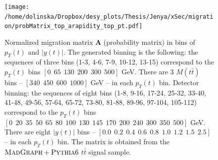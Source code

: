 \begin{figure}[p]
  \centering
  \texttt{[image: /home/dolinska/Dropbox/desy\_plots/Thesis/Jenya/xSec/migration/probMatrix\_top\_arapidity\_top\_pt.pdf]}
  \caption{Normalized migration matrix $\mathbf{A}$ (probability matrix) in bins of $p_{T}(t)$ and $|y(t)|$. The generated binning is the following:
          the sequences of three bins (1-3, 4-6, 7-9, 10-12, 13-15) correspond to the $p_{T}(t)$ bins $[0\:\:65\:\:130\:\:200\:\:300\:\:500]$ GeV.
          There are 3 $M(t\bar{t})$ bins -- $[340\:\:450\:\:600\:\:1000]$ GeV -- in each $p_{T}(t)$ bin.
          Detector binning:
          the sequences of eight bins (1-8, 9-16, 17-24, 25-32, 33-40, 41-48, 49-56, 57-64, 65-72, 73-80, 81-88, 89-96, 97-104, 105-112) correspond 
          to the $p_{T}(t)$ bins $[0\:\:20\:\:35\:\:50\:\:65\:\:80\:\:100\:\:130\:\:145\:\:170\:\:200\:\:240\:\:300\:\:350\:\:500]$ GeV.
          There are eight $|y(t)|$ bins -- $[0.0\:\:0.2\:\:0.4\:\:0.6\:\:0.8\:\:1.0\:\:1.2\:\:1.5\:\:2.5]$ -- in each $p_{T}(t)$ bin.
          The matrix is obtained from the $\textsc{MadGraph}+\textsc{Pythia}6$ $t\bar{t}$ signal sample.}
  \label{fig:migMat}
\end{figure}


